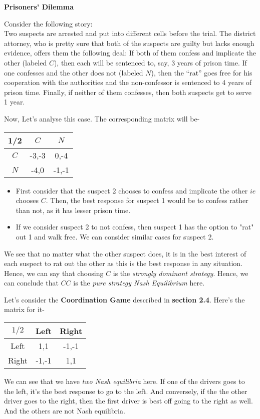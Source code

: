 \begin{flushleft}\textbf{Prisoners' Dilemma}\end{flushleft}
Consider the following story:\\
Two suspects are arrested and put into different cells before the trial. The district attorney, who is pretty sure that both of the suspects are guilty but lacks enough evidence, offers them the following deal: If both of them confess and implicate the other (labeled $C$), then each will be sentenced to, say, 3 years of prison time. If one confesses and the other does not (labeled $N$), then the “rat” goes free for his cooperation with the authorities and the non-confessor is sentenced to 4 years of prison time. Finally, if neither of them confesses, then both suspects get to serve 1 year. 

Now, Let's analyse this case. The corresponding matrix will be- 
\begin{center}\begin{tabular}{|c|c|c|} \hline
1/2 & $C$ & $N$ \\ \hline
$C$ & -3,-3 & 0,-4 \\ \hline
$N$ & -4,0 & -1,-1 \\ \hline 
\end{tabular}\end{center}

\begin{itemize}
\item First consider that the suspect 2 chooses to confess and implicate the other $ie$ chooses $C$. Then, the best response for suspect 1 would be to confess rather than not, as it has lesser prison time. 
\item If we consider suspect 2 to not confess, then suspect 1 has the option to "rat" out 1 and walk free. We can consider similar cases for suspect 2.
\end{itemize}
We see that no matter what the other suspect does, it is in the best interest of each suspect to rat out the other as this is the best response in any situation. Hence, we can say that choosing $C$ is the \textit{strongly dominant strategy}. Hence, we can conclude that $CC$ is the \textit{pure strategy Nash Equilibrium} here.\newline

Let's consider the \textbf{Coordination Game} described in \textbf{section 2.4}. Here's the matrix for it-

		\begin{center}
		\begin{tabular}{|c|c|c|}\hline
		$1/2$ & Left & Right \\ \hline
		Left &  1,1 & -1,-1 \\ \hline
		Right & -1,-1 & 1,1 \\ \hline
		\end{tabular}
		\end{center}
We can see that we have \textit{two Nash equilibria} here. If one of the drivers goes to the left, it's the best response to go to the left. And conversely, if the the other driver goes to the right, then the first driver is best off going to the right as well. And the others are not Nash equilibria.


